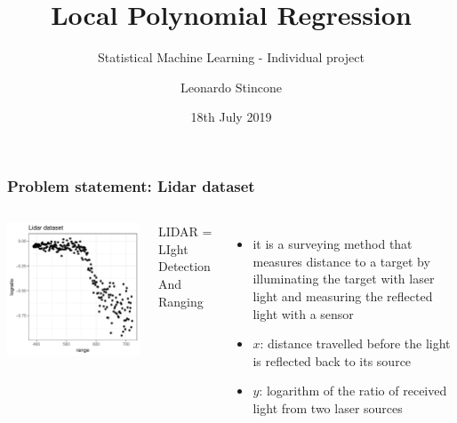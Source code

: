 \documentclass[pdf]{beamer}\usepackage[]{graphicx}\usepackage[]{color}
\title{Local Polynomial Regression}
\subtitle{Statistical Machine Learning - Individual project}
\author{Leonardo Stincone}
\date{18th July 2019}
\institute[units]{Università degli Studi di Trieste}
\makeatletter
\def\maxwidth{ %
  \ifdim\Gin@nat@width>\linewidth
    \linewidth
  \else
    \Gin@nat@width
  \fi
}
\newenvironment{knitrout}{}{} %
\makeatother
\begin{document}
\begin{frame}
\titlepage
\end{frame}






\begin{frame}
\frametitle{Problem statement: Lidar dataset}



\begin{columns}
\begin{knitrout}
\color{fgcolor}

{\centering \includegraphics[width=\maxwidth]{figure/lidarPlot-1} 

}



\end{knitrout}
\small LIDAR = LIght Detection And Ranging
\begin{itemize}
\item it is a surveying method that measures distance to a target by illuminating the target with laser light and measuring the reflected light with a sensor
\item $x$: distance travelled before the light is reflected back to its source
\item $y$: logarithm of the ratio of received light from two laser sources
\end{itemize}
\end{columns}


\end{frame}
\end{document}
